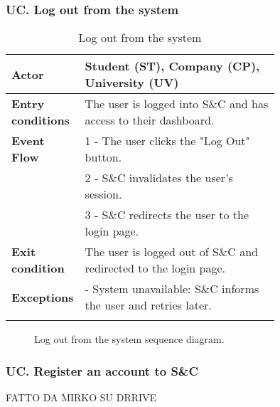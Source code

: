 \subsubsection*{UC\cuc . Log out from the system}
\begin{center}
    \begin{longtable}{|l|p{0.75\linewidth}|}
        \hline
        \textbf{Actor}            & Student (ST), Company (CP), University (UV) \\
        \hline
        \textbf{Entry conditions} & The user is logged into S\&C and has access to their dashboard. \\
        \hline
        \textbf{Event Flow}       & 1 - The user clicks the "Log Out" button. \\
                                  & 2 - S\&C invalidates the user's session. \\
                                  & 3 - S\&C redirects the user to the login page. \\
        \hline
        \textbf{Exit condition}   & The user is logged out of S\&C and redirected to the login page. \\       
        \hline
        \textbf{Exceptions}       & - System unavailable: S\&C informs the user and retries later. \\
        \hline
        \caption{Log out from the system}
        \label{tab:logout_usecase}
    \end{longtable}
\end{center}

\begin{figure}[H]
    \begin{center}
        
        \caption{Log out from the system sequence diagram.}
        \label{fig:logout_seqd}%
    \end{center}
\end{figure}

\subsubsection*{UC\cuc . Register an account to S\&C}
FATTO DA MIRKO SU DRRIVE

